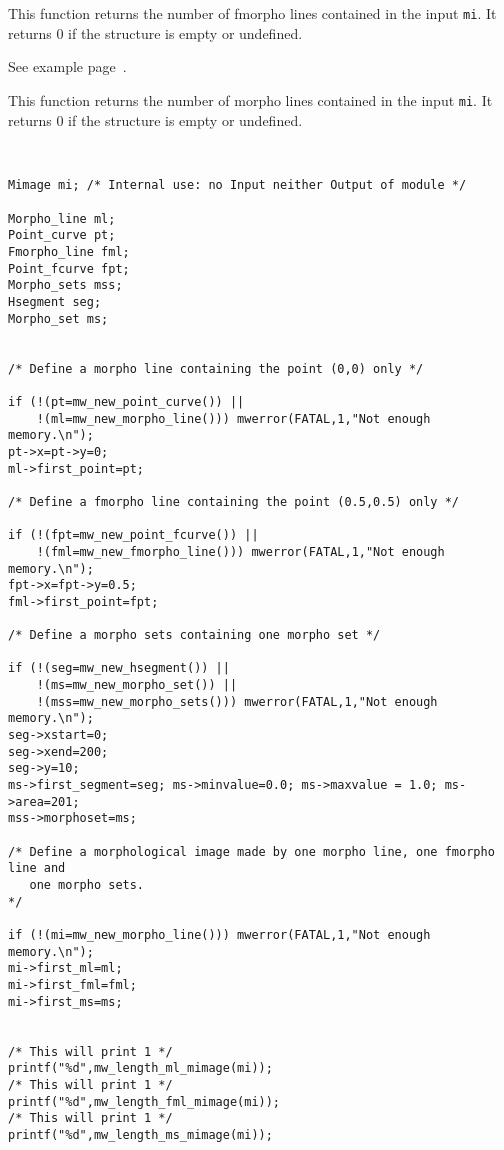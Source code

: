 \newpage %


\Description
This function returns the number of fmorpho lines contained in the input
\verb+mi+.
It returns $0$ if the structure is empty or undefined.

\Next
\Example
See example page~\pageref{length_ml-example}.

\newpage %


\Description
This function returns the number of morpho lines contained in the input
\verb+mi+.
It returns $0$ if the structure is empty or undefined.

\Next
\Example
\label{length_ml-example}
\begin{verbatim}


Mimage mi; /* Internal use: no Input neither Output of module */

Morpho_line ml; 
Point_curve pt;
Fmorpho_line fml; 
Point_fcurve fpt;
Morpho_sets mss;
Hsegment seg;
Morpho_set ms;


/* Define a morpho line containing the point (0,0) only */

if (!(pt=mw_new_point_curve()) ||
    !(ml=mw_new_morpho_line())) mwerror(FATAL,1,"Not enough memory.\n");
pt->x=pt->y=0;
ml->first_point=pt;

/* Define a fmorpho line containing the point (0.5,0.5) only */

if (!(fpt=mw_new_point_fcurve()) ||
    !(fml=mw_new_fmorpho_line())) mwerror(FATAL,1,"Not enough memory.\n");
fpt->x=fpt->y=0.5;
fml->first_point=fpt;

/* Define a morpho sets containing one morpho set */

if (!(seg=mw_new_hsegment()) ||
    !(ms=mw_new_morpho_set()) ||
    !(mss=mw_new_morpho_sets())) mwerror(FATAL,1,"Not enough memory.\n");
seg->xstart=0; 
seg->xend=200;
seg->y=10;
ms->first_segment=seg; ms->minvalue=0.0; ms->maxvalue = 1.0; ms->area=201;
mss->morphoset=ms;

/* Define a morphological image made by one morpho line, one fmorpho line and
   one morpho sets.
*/

if (!(mi=mw_new_morpho_line())) mwerror(FATAL,1,"Not enough memory.\n");
mi->first_ml=ml;
mi->first_fml=fml;
mi->first_ms=ms;


/* This will print 1 */
printf("%d",mw_length_ml_mimage(mi));
/* This will print 1 */
printf("%d",mw_length_fml_mimage(mi));
/* This will print 1 */
printf("%d",mw_length_ms_mimage(mi));

\end{verbatim}

